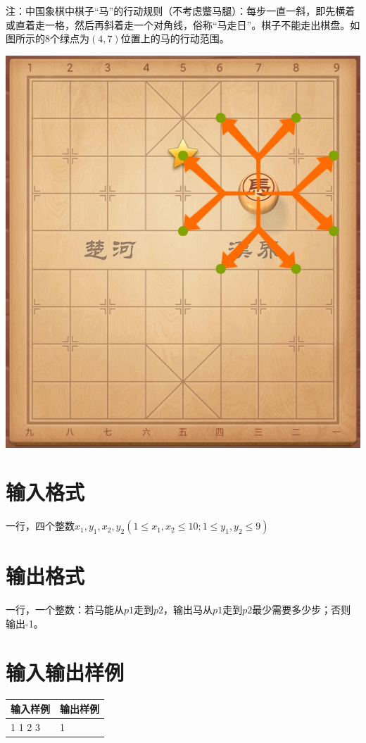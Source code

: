 \documentclass[
	lang=cn,
	color=green
]{elegantbook}
\begin{document}
注：中国象棋中棋子“马”的行动规则（不考虑蹩马腿）：每步一直一斜，即先横着或直着走一格，然后再斜着走一个对角线，俗称“马走日”。棋子不能走出棋盘。如图所示的$8$个绿点为$(4,7)$位置上的马的行动范围。

\begin{center}
	\includegraphics[scale=0.1]{knight.jpg}
\end{center}

\section*{输入格式}
一行，四个整数$x_1,y_1,x_2,y_2(1 \leq x_1,x_2 \leq 10; 1 \leq y_1,y_2 \leq 9)$

\section*{输出格式}
一行，一个整数：若马能从$p1$走到$p2$，输出马从$p1$走到$p2$最少需要多少步；否则输出-1。

\section*{输入输出样例}
\begin{tabularx}{450pt}{X|X}
	\toprule
	输入样例 & 输出样例 \\
	\midrule
	1 1 2 3  & 1        \\
	\bottomrule
\end{tabularx}
\vspace{0.5cm}
\end{document}
